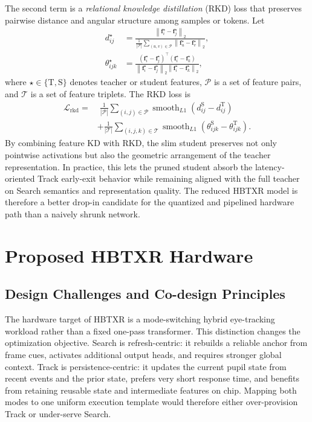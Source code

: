 \documentclass[journal]{IEEEtran}
\begin{document}
The second term is a \emph{relational knowledge distillation} (RKD) loss that preserves pairwise distance and angular structure among samples or tokens. Let
\begin{align}
d_{ij}^{\star} &=
\frac{\left\|\mathbf f_i^{\star}-\mathbf f_j^{\star}\right\|_2}
{\frac{1}{|\mathcal P|}\sum_{(u,v)\in\mathcal P}\left\|\mathbf f_u^{\star}-\mathbf f_v^{\star}\right\|_2},\\
\theta_{ijk}^{\star} &=
\frac{\left(\mathbf f_i^{\star}-\mathbf f_j^{\star}\right)^{\top}
\left(\mathbf f_i^{\star}-\mathbf f_k^{\star}\right)}
{\left\|\mathbf f_i^{\star}-\mathbf f_j^{\star}\right\|_2
 \left\|\mathbf f_i^{\star}-\mathbf f_k^{\star}\right\|_2},
\end{align}
where $\star\in\{\mathrm{T},\mathrm{S}\}$ denotes teacher or student features, $\mathcal P$ is a set of feature pairs, and $\mathcal T$ is a set of feature triplets. The RKD loss is
\begin{align}
\mathcal L_{\mathrm{rkd}}=
&\;\frac{1}{|\mathcal P|}
\sum_{(i,j)\in\mathcal P}
\operatorname{smooth}_{L1}\!\left(d_{ij}^{\mathrm{S}}-d_{ij}^{\mathrm{T}}\right)
\nonumber\\
&+
\frac{1}{|\mathcal T|}
\sum_{(i,j,k)\in\mathcal T}
\operatorname{smooth}_{L1}\!\left(\theta_{ijk}^{\mathrm{S}}-\theta_{ijk}^{\mathrm{T}}\right).
\end{align}
By combining feature KD with RKD, the slim student preserves not only pointwise activations but also the geometric arrangement of the teacher representation. In practice, this lets the pruned student absorb the latency-oriented Track early-exit behavior while remaining aligned with the full teacher on Search semantics and representation quality. The reduced HBTXR model is therefore a better drop-in candidate for the quantized and pipelined hardware path than a naively shrunk network.

\section{Proposed HBTXR Hardware}

\subsection{Design Challenges and Co-design Principles}
The hardware target of HBTXR is a mode-switching hybrid eye-tracking workload rather than a fixed one-pass transformer. This distinction changes the optimization objective. Search is refresh-centric: it rebuilds a reliable anchor from frame cues, activates additional output heads, and requires stronger global context. Track is persistence-centric: it updates the current pupil state from recent events and the prior state, prefers very short response time, and benefits from retaining reusable state and intermediate features on chip. Mapping both modes to one uniform execution template would therefore either over-provision Track or under-serve Search.
\end{document}
